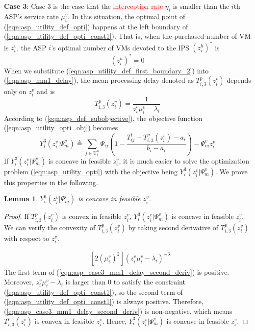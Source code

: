 \documentclass[10pt,journal, compsoc]{IEEEtran}
\newtheorem{lemma}{Lemma}
\begin{document}
\textbf{Case 3}: Case 3 is the case that the \textcolor{red}{interception rate} $\eta_i$ is smaller than the $i$th ASP's service rate $\mu_i^v$. In this situation, the optimal point of (\ref{eqn:asp_utility_def_opti}) happens at the left boundary of (\ref{eqn:asp_utility_def_opti_const1}). That is, when the purchased number of VM is $z_i^v$, the ASP $i$'s optimal number of VMs devoted to the IPS $(z_i^h)^*$ is
\begin{equation} \label{eqn:asp_utility_def_first_boundary_2}
(z_i^h)^* = 0
\end{equation}
When we substitute (\ref{eqn:asp_utility_def_first_boundary_2}) into (\ref{eqn:asp_mm1_delay}), the mean processing delay denoted as $T_{i,3}^p(z_i^v)$ depends only on $z_i^v$ and is
\begin{equation}\label{eqn:asp_case3_mm1_delay}
T_{i,3}^p(z_i^v) = \frac{1}{z_i^v \mu_i^v-\lambda_i}
\end{equation}
According to %
(\ref{eqn:asp_def_subobjective}), the objective function (\ref{eqn:asp_utility_opti_obj}) becomes
\begin{equation}\label{eqn:asp_case3_objective}
Y_i^3(z_i^v|\Psi_m^v) \triangleq \sum_{j \in \mathrm{U}_i^n}\Psi_{ij}(1-\frac{T_{ij}^t + T_{i,3}^p(z_i^v)-a_i}{b_i-a_i}) - \Psi_m^vz_i^v
\end{equation}
If $Y_i^3(z_i^v|\Psi_m^v)$ is concave in feasible $z_i^v$, it is much easier to solve the optimization problem (\ref{eqn:asp_utility_opti}) with the objective being $Y_i^3(z_i^v|\Psi_m^v)$. We prove this properties in the following.
\begin{lemma} \label{lemma:asp_case3_utility_concave}
$Y_i^3(z_i^v|\Psi_m^v)$ is concave in feasible $z_i^v$.
\end{lemma}
\begin{proof}
If $T_{i,3}^p(z_i^v)$ is convex in feasible $z_i^v$, $Y_i^3(z_i^v|\Psi_m^v)$ is concave in feasible $z_i^v$. We can verify the convexity of $T_{i,3}^p(z_i^v)$ by taking second derivative of $T_{i,3}^p(z_i^v)$ with respect to $z_i^v$.

\begin{equation} \label{eqn:asp_case3_mm1_delay_second_deriv}
\begin{aligned}
&[2(\mu_i^v)^2](z_i^v\mu_i^v-\lambda_i)^{-3}
\end{aligned}
\end{equation}
The first term of (\ref{eqn:asp_case3_mm1_delay_second_deriv}) is positive. Moreover, $z_i^v\mu_i^v - \lambda_i$ is larger than $0$ to satisfy the constraint (\ref{eqn:asp_utility_def_opti_const1}), so the second term of (\ref{eqn:asp_utility_def_opti_const1}) is always positive. Therefore, (\ref{eqn:asp_case3_mm1_delay_second_deriv}) is non-negative, which means $T_{i,3}^p(z_i^v)$ is convex in feasible $z_i^v$. Hence, $Y_i^3(z_i^v|\Psi_m^v)$ is concave in feasible $z_i^v$. \qedhere
\end{proof}
\end{document}
